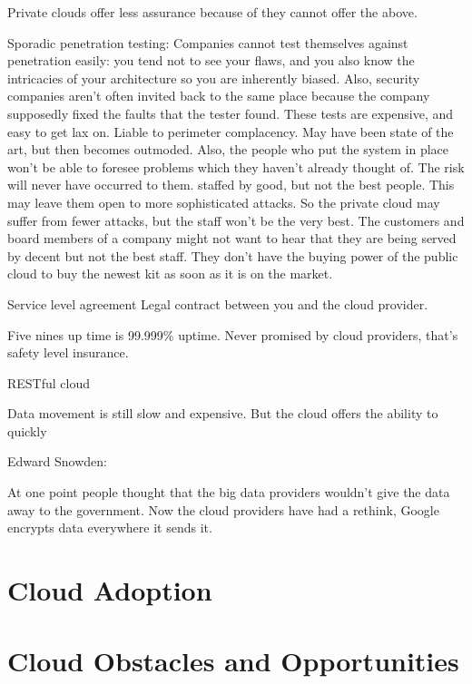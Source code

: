 \documentclass[11pt]{article}
\begin{document}
Private clouds offer less assurance because of they cannot offer the above.

Sporadic penetration testing: Companies cannot test themselves against penetration easily: you tend not to see your flaws, and you also know the intricacies of your architecture so you are inherently biased. Also, security companies aren’t often invited back to the same place because the company supposedly fixed the faults that the tester found. These tests are expensive, and easy to get lax on.
Liable to perimeter complacency. May have been state of the art, but then becomes outmoded. Also, the people who put the system in place won’t be able to foresee problems which they haven’t already thought of. The risk will never have occurred to them.
staffed by good, but not the best people. This may leave them open to more sophisticated attacks. So the private cloud may suffer from fewer attacks, but the staff won’t be the very best. The customers and board members of a company might not want to hear that they are being served by decent but not the best staff.
They don’t have the buying power of the public cloud to buy the newest kit as soon as it is on the market.

Service level agreement
Legal contract between you and the cloud provider.

Five nines up time is 99.999\% uptime. Never promised by cloud providers, that’s safety level insurance.

RESTful cloud

Data movement is still slow and expensive. But the cloud offers the ability to quickly 

Edward Snowden:

At one point people thought that the big data providers wouldn’t give the data away to the government. Now the cloud providers have had a rethink, Google encrypts data everywhere it sends it.




\section{Cloud Adoption}



\section{Cloud Obstacles and Opportunities}
\end{document}
